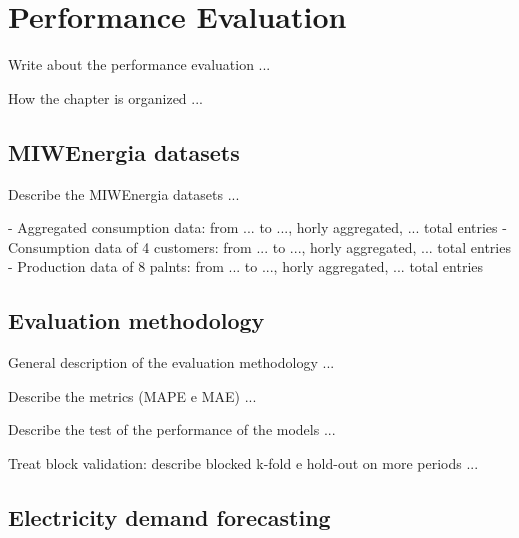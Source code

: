 \chapter{Performance Evaluation}
\label{cha:evaluation}
\vspace{0.4 cm}

Write about the performance evaluation ...


How the chapter is organized ...


\section{MIWEnergia datasets}
\label{sec:datasets}
\vspace{0.2 cm}

Describe the MIWEnergia datasets ...

- Aggregated consumption data: from ... to ..., horly aggregated, ... total entries
- Consumption data of 4 customers: from ... to ..., horly aggregated, ... total entries
- Production data of 8 palnts: from ... to ..., horly aggregated, ... total entries


\section{Evaluation methodology}
\label{sec:methodology}
\vspace{0.2 cm}

General description of the evaluation methodology ...

Describe the metrics (MAPE e MAE) ...

Describe the test of the performance of the models ...

Treat block validation: describe blocked k-fold e hold-out on more periods ...


\section{Electricity demand forecasting}
\label{sec:demandval}
\vspace{0.2 cm}

